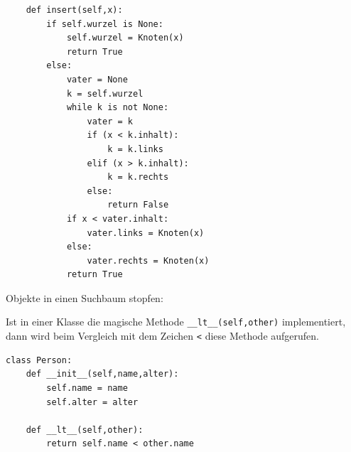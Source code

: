 \documentclass{beamer}
\begin{document}
\begin{frame}[fragile]
\begin{lstlisting}
    def insert(self,x):
        if self.wurzel is None:
            self.wurzel = Knoten(x)
            return True
        else:
            vater = None
            k = self.wurzel
            while k is not None:
                vater = k
                if (x < k.inhalt):
                    k = k.links
                elif (x > k.inhalt):
                    k = k.rechts
                else:
                    return False
            if x < vater.inhalt:
                vater.links = Knoten(x)
            else:
                vater.rechts = Knoten(x)
            return True
\end{lstlisting} 
\end{frame}

\begin{frame}[fragile]
Objekte in einen Suchbaum stopfen:

Ist in einer Klasse die magische Methode \texttt{\_\_lt\_\_(self,other)} implementiert, dann wird 
beim Vergleich mit dem Zeichen \texttt{<} diese Methode aufgerufen.

\begin{lstlisting}
class Person:
    def __init__(self,name,alter):
        self.name = name
        self.alter = alter

    def __lt__(self,other):
        return self.name < other.name
\end{lstlisting} 

\end{frame}
 
\end{document}
